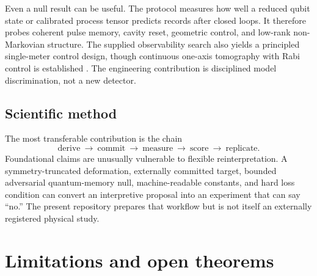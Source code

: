 \documentclass[10pt]{article}
\theoremstyle{definition}
\theoremstyle{remark}
\begin{document}
Even a null result can be useful. The protocol measures how well a reduced qubit state or calibrated process tensor predicts records after closed loops. It therefore probes coherent pulse memory, cavity reset, geometric control, and low-rank non-Markovian structure. The supplied observability search also yields a principled single-meter control design, though continuous one-axis tomography with Rabi control is established \citep{Chantasri2019}. The engineering contribution is disciplined model discrimination, not a new detector.

\subsection{Scientific method}

The most transferable contribution is the chain
\[
\boxed{
\text{derive}\ \longrightarrow\
\text{commit}\ \longrightarrow\
\text{measure}\ \longrightarrow\
\text{score}\ \longrightarrow\
\text{replicate}.
}
\]
Foundational claims are unusually vulnerable to flexible reinterpretation. A symmetry-truncated deformation, externally committed target, bounded adversarial quantum-memory null, machine-readable constants, and hard loss condition can convert an interpretive proposal into an experiment that can say ``no.'' The present repository prepares that workflow but is not itself an externally registered physical study.

\section{Limitations and open theorems}
\end{document}
